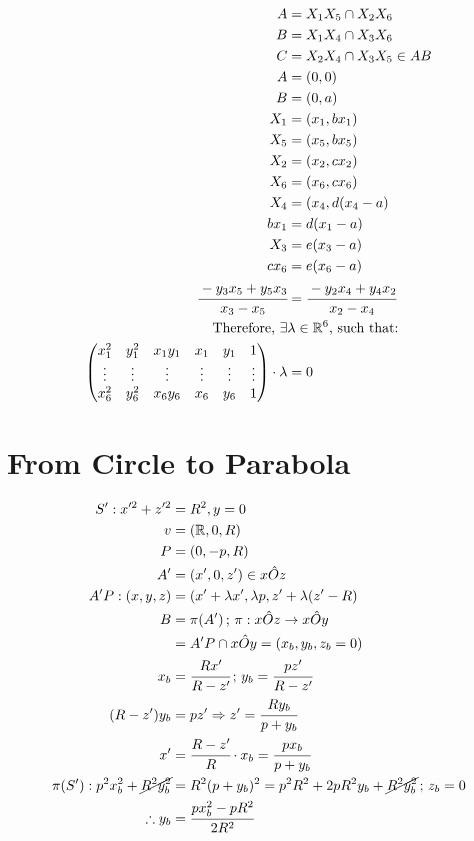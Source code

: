 \documentclass[12pt]{article}
\numberwithin{table}{section}
\begin{document}
\begin{align}
    A &= X_1 X_5 \cap X_2 X_6 \\
    B &= X_1 X_4 \cap X_3 X_6 \\
    C &= X_2 X_4 \cap X_3 X_5 \in AB \\
    A &= (0,0) \\
    B &= (0,a) \\
    X_1 &= (x_1, bx_1) \\
    X_5 &= (x_5, bx_5) \\
    X_2 &= (x_2, cx_2) \\
    X_6 &= (x_6, cx_6) \\
    X_4 &= (x_4, d(x_4 - a) \\
    bx_1 &= d(x_1 - a) \\
    X_3 &= e(x_3 - a) \\
    cx_6 &= e(x_6 - a) \\
    \cfrac{-y_3 x_5 + y_5 x_3}{x_3 - x_5} &= \cfrac{-y_2 x_4 + y_4 x_2}{x_2 - x_4} \\
    \text{Therefore, } \exists &\lambda\in\mathbb{R}^6\text{, such that:} \nonumber \\
    \begin{pmatrix}
        x_1^2 & y_1^2 & x_1 y_1 & x_1 & y_1 & 1 \\
        \vdots & \vdots & \vdots & \vdots & \vdots & \vdots \\
        x_6^2 & y_6^2 & x_6 y_6 & x_6 & y_6 & 1 
    \end{pmatrix}\cdot \lambda &= 0
\end{align}

\section{From Circle to Parabola}

\begin{align}
S': x'^2 + z'^2 &= R^2, y = 0 \\
v &= (\mathbb{R}, 0, R) \\
P &= (0, -p, R) \\
A' &= (x', 0, z') \in x\hat Oz \\
A'P: (x,y,z) &= (x' + \lambda x', \lambda p, z' + \lambda (z' - R) \\
B &= \pi(A')\,;\,\pi: x\hat Oz \to x\hat Oy \\
&= A'P \cap x\hat O y = (x_b, y_b, z_b = 0) \\
x_b &= \cfrac{Rx'}{R-z'}\,;\,y_b = \cfrac{pz'}{R-z'} \\
(R - z') y_b &= pz' \Rightarrow z' = \cfrac{Ry_b}{p+y_b} \\
x' &= \cfrac{R-z'}{R}\cdot x_b = \cfrac{px_b}{p+y_b} \\
\pi(S'): p^2 x_b^2 + \cancel{R^2 y_b^2} &= R^2 (p+y_b)^2 = p^2 R^2 + 2pR^2y_b + \cancel{R^2 y_b^2}\,;\,z_b=0 \\
\therefore y_b &= \cfrac{px_b^2 - p R^2}{2R^2}
\end{align}
\end{document}
